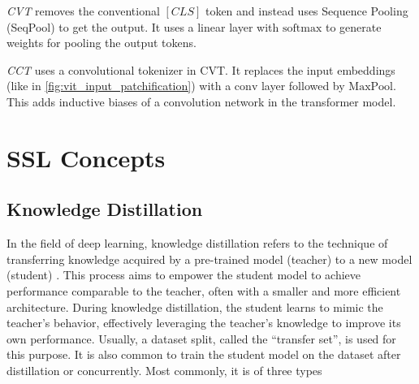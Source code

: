 \emph{CVT} removes the conventional $\left[CLS\right]$ token and
instead uses Sequence Pooling (SeqPool) to get the output. It uses a 
linear layer with $\mathrm{softmax}$ to generate weights for pooling
the output tokens.

\emph{CCT} uses a convolutional tokenizer in CVT. It replaces the
input embeddings (like in \cref{fig:vit_input_patchification}) with a
$\mathrm{conv}$ layer followed by $\mathrm{MaxPool}$. This adds
inductive biases of a convolution network in the transformer model.

\section{SSL Concepts}

\subsection{Knowledge Distillation}
\label{subsec:fm-k-distill}

In the field of deep learning, knowledge distillation refers to the
technique of transferring knowledge acquired by a pre-trained model
(teacher) to a new model (student) \cite{Hinton2015DistillingTK}. This
process aims to empower the student model to achieve performance
comparable to the teacher, often with a smaller and more efficient
architecture. During knowledge distillation, the student learns to
mimic the teacher's behavior, effectively leveraging the teacher's
knowledge to improve its own performance. Usually, a dataset split,
called the ``transfer set'', is used for this purpose. It is also
common to train the student model on the dataset after distillation or
concurrently. Most commonly, it is of three types

